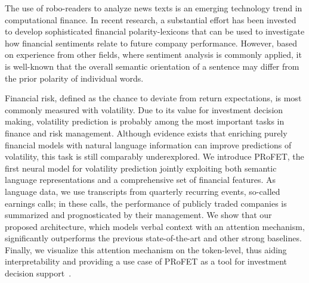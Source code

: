 \documentclass[11pt]{article}
\begin{document}
The use of robo-readers to analyze news texts is an emerging technology trend in computational finance. In recent
research, a substantial effort has been invested to develop sophisticated financial polarity-lexicons that can be used to
investigate how financial sentiments relate to future company performance. However, based on experience from other
fields, where sentiment analysis is commonly applied, it is well-known
that the overall semantic orientation of a sentence may differ from
the prior polarity of individual words.

Financial risk, defined as the chance to deviate from return expectations, is most commonly measured
with volatility. Due to its value for investment decision making, volatility prediction is probably
among the most important tasks in finance and risk management. Although evidence exists that enriching purely financial models with natural language
information can improve predictions of volatility, this task is still comparably underexplored. We introduce PRoFET, the
first neural model for volatility prediction jointly exploiting both
semantic language representations and a comprehensive set of financial
features. As language data, we use transcripts from quarterly
recurring events, so-called earnings calls; in these calls, the performance of publicly traded companies is summarized and prognosticated by their management. We show that our
proposed architecture, which models verbal context with an attention mechanism, significantly outperforms the previous state-of-the-art and other strong
baselines. Finally, we visualize this attention mechanism on the token-level, thus aiding interpretability and providing a use case of PRoFET as a tool
for investment decision support~\cite{theil2019}.




\end{document}
